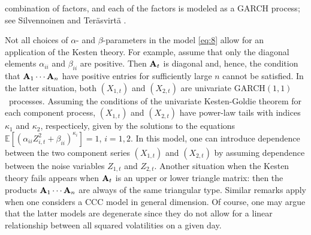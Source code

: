 \documentclass[11pt,a4]{amsart}
\newcommand{\garch}{{\rm GARCH}$(1,1)$}
\newcommand{\bfA}{{\bf A}}
\newcommand{\E }{{\mathbb E}}
\newcommand{\1}{{\mathbf 1}}
\begin{document}
combination of factors, and each of the factors is modeled as a GARCH
process; see Silvennoinen and Ter\"asvirt\"a \cite{silventeras:2009}.
\par
Not all choices of $\alpha$- and $\beta$-parameters in the model \eqref{eq:8} allow for an
application of the Kesten theory. For example, assume that only the diagonal elements $\alpha_{ii}$ and $\beta_{ii}$ are positive.
Then $\bfA_t$ is diagonal and, hence, the condition that $\bfA_1\cdots\bfA_n$ have positive entries for sufficiently large $n$ 
cannot be satisfied. In the latter situation, both $(X_{1,t})$ and $(X_{2,t})$ are univariate \garch\ processes. Assuming the
conditions of the univariate Kesten-Goldie theorem for each component process, $(X_{1,t})$ and $(X_{2,t})$ have power-law tails
with indices $\kappa_1$ and $\kappa_2$, respecticely,  given by the solutions to the equations 
$\E [(\alpha_{ii} Z_{i,t}^2+\beta_{ii})^{\kappa_i}]=1$, $i=1,2$. In this model, one can introduce dependence between the two component series $(X_{1,t})$ and $(X_{2,t})$ by assuming dependence between the noise variables $Z_{1,t}$ and $Z_{2,t}$. Another situation when the Kesten theory fails
appears when $\bfA_t$ is an upper or lower triangle matrix: then the products  $\bfA_1\cdots\bfA_n$ are always of the same triangular type.
Similar remarks apply when one considers a CCC model in general dimension. Of course, one may argue that the latter models
are degenerate since they do not allow for a linear relationship between all squared volatilities
on a given day. 
\end{document}

